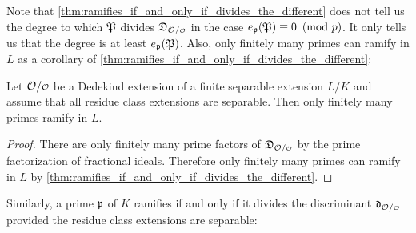     Note that \cref{thm:ramifies_if_and_only_if_divides_the_different} does not tell us the degree to which $\mathfrak{P}$ divides $\mf{D}_{\mc{O}/\smc{O}}$ in the case $e_{\mathfrak{p}}(\mathfrak{P}) \equiv 0 \ \left(\text{mod }p\right)$. It only tells us that the degree is at least $e_{\mathfrak{p}}(\mathfrak{P})$. Also, only finitely many primes can ramify in $L$ as a corollary of \cref{thm:ramifies_if_and_only_if_divides_the_different}:

    \begin{corollary}\label{cor:finitely_many_primes_ramify_L}
      Let $\mc{O}/\smc{O}$ be a Dedekind extension of a finite separable extension $L/K$ and assume that all residue class extensions are separable. Then only finitely many primes ramify in $L$.
    \end{corollary}
    \begin{proof}
      There are only finitely many prime factors of $\mf{D}_{\mc{O}/\smc{O}}$ by the prime factorization of fractional ideals. Therefore only finitely many primes can ramify in $L$ by \cref{thm:ramifies_if_and_only_if_divides_the_different}.
    \end{proof}

    Similarly, a prime $\mathfrak{p}$ of $K$ ramifies if and only if it divides the discriminant $\mf{d}_{\mc{O}/\smc{O}}$ provided the residue class extensions are separable:

